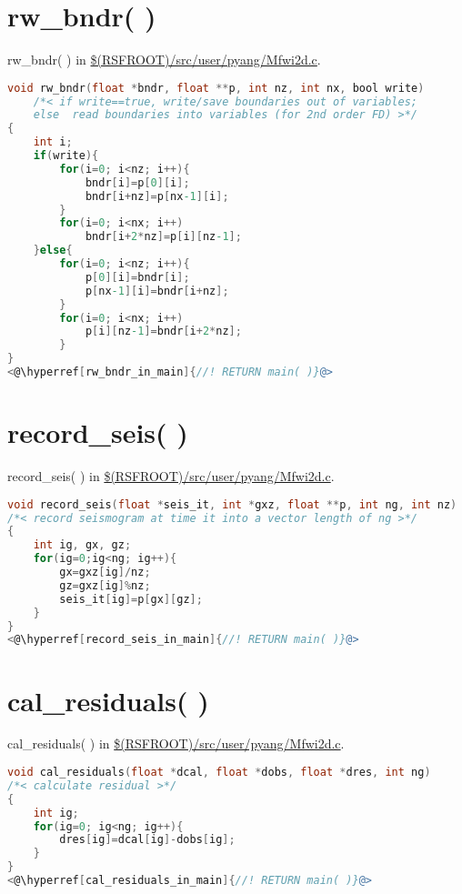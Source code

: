 \documentclass[a4paper,11pt]{article}
\theoremstyle{mytheor}
\begin{document}
\section*{rw\_bndr( )}
rw\_bndr( ) in \url{$(RSFROOT)/src/user/pyang/Mfwi2d.c}.
\begin{lstlisting}[label={rw_bndr},language=C,tabsize=4,caption=rw\_bndr( )]
void rw_bndr(float *bndr, float **p, int nz, int nx, bool write)
	/*< if write==true, write/save boundaries out of variables;
	else  read boundaries into variables (for 2nd order FD) >*/
{
	int i;
	if(write){
		for(i=0; i<nz; i++){
			bndr[i]=p[0][i];
			bndr[i+nz]=p[nx-1][i];
		}
		for(i=0; i<nx; i++) 
			bndr[i+2*nz]=p[i][nz-1];
	}else{
		for(i=0; i<nz; i++){
			p[0][i]=bndr[i];
			p[nx-1][i]=bndr[i+nz];
		}
		for(i=0; i<nx; i++) 
			p[i][nz-1]=bndr[i+2*nz];
		}
}
<@\hyperref[rw_bndr_in_main]{//! RETURN main( )}@>
\end{lstlisting}

\section*{record\_seis( )}
record\_seis( ) in \url{$(RSFROOT)/src/user/pyang/Mfwi2d.c}.
\begin{lstlisting}[label={record_seis},language=C,tabsize=4,caption=record\_seis( )]
void record_seis(float *seis_it, int *gxz, float **p, int ng, int nz)
/*< record seismogram at time it into a vector length of ng >*/
{
	int ig, gx, gz;
	for(ig=0;ig<ng; ig++){
		gx=gxz[ig]/nz;
		gz=gxz[ig]%nz;
		seis_it[ig]=p[gx][gz];
	}
}
<@\hyperref[record_seis_in_main]{//! RETURN main( )}@>
\end{lstlisting}

\section*{cal\_residuals( )}
cal\_residuals( ) in \url{$(RSFROOT)/src/user/pyang/Mfwi2d.c}.
\begin{lstlisting}[label={cal_residuals},language=C,tabsize=4,caption=cal\_residuals( )]
void cal_residuals(float *dcal, float *dobs, float *dres, int ng)
/*< calculate residual >*/
{
	int ig;
	for(ig=0; ig<ng; ig++){
		dres[ig]=dcal[ig]-dobs[ig];
	}
}
<@\hyperref[cal_residuals_in_main]{//! RETURN main( )}@>
\end{lstlisting}
\end{document}
